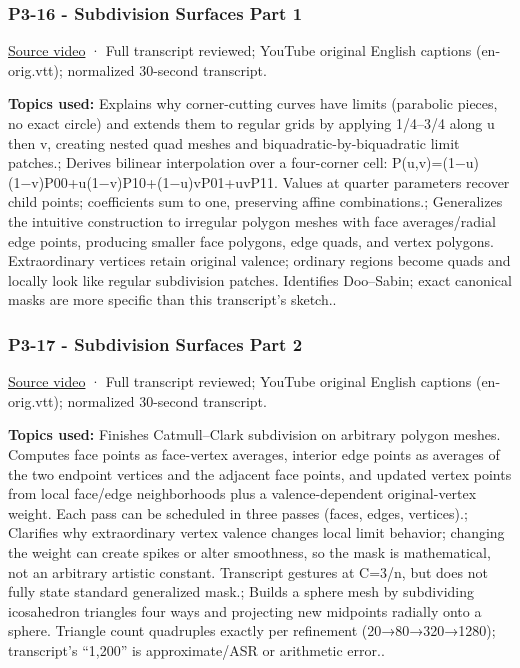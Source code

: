 \subsubsection{P3-16 - Subdivision Surfaces Part 1}\label{04-visual-computing-ii-ch036-p3-16---subdivision-surfaces-part-1}

\hypertarget{04-visual-computing-ii-ch036-p3-16---subdivision-surfaces-part-1}{}

\href{https://www.youtube.com/watch?v=9uscFr2Hht0}{Source video} · Full transcript reviewed; YouTube original English captions (en-orig.vtt); normalized 30-second transcript.

\textbf{Topics used:} Explains why corner-cutting curves have limits (parabolic pieces, no exact circle) and extends them to regular grids by applying 1/4--3/4 along u then v, creating nested quad meshes and biquadratic-by-biquadratic limit patches.; Derives bilinear interpolation over a four-corner cell: P(u,v)=(1−u)(1−v)P00+u(1−v)P10+(1−u)vP01+uvP11. Values at quarter parameters recover child points; coefficients sum to one, preserving affine combinations.; Generalizes the intuitive construction to irregular polygon meshes with face averages/radial edge points, producing smaller face polygons, edge quads, and vertex polygons. Extraordinary vertices retain original valence; ordinary regions become quads and locally look like regular subdivision patches. Identifies Doo--Sabin; exact canonical masks are more specific than this transcript's sketch..

\subsubsection{P3-17 - Subdivision Surfaces Part 2}\label{04-visual-computing-ii-ch036-p3-17---subdivision-surfaces-part-2}

\hypertarget{04-visual-computing-ii-ch036-p3-17---subdivision-surfaces-part-2}{}

\href{https://www.youtube.com/watch?v=THiF7-QxKXk}{Source video} · Full transcript reviewed; YouTube original English captions (en-orig.vtt); normalized 30-second transcript.

\textbf{Topics used:} Finishes Catmull--Clark subdivision on arbitrary polygon meshes. Computes face points as face-vertex averages, interior edge points as averages of the two endpoint vertices and the adjacent face points, and updated vertex points from local face/edge neighborhoods plus a valence-dependent original-vertex weight. Each pass can be scheduled in three passes (faces, edges, vertices).; Clarifies why extraordinary vertex valence changes local limit behavior; changing the weight can create spikes or alter smoothness, so the mask is mathematical, not an arbitrary artistic constant. Transcript gestures at C=3/n, but does not fully state standard generalized mask.; Builds a sphere mesh by subdividing icosahedron triangles four ways and projecting new midpoints radially onto a sphere. Triangle count quadruples exactly per refinement (20→80→320→1280); transcript's ``1,200'' is approximate/ASR or arithmetic error..

